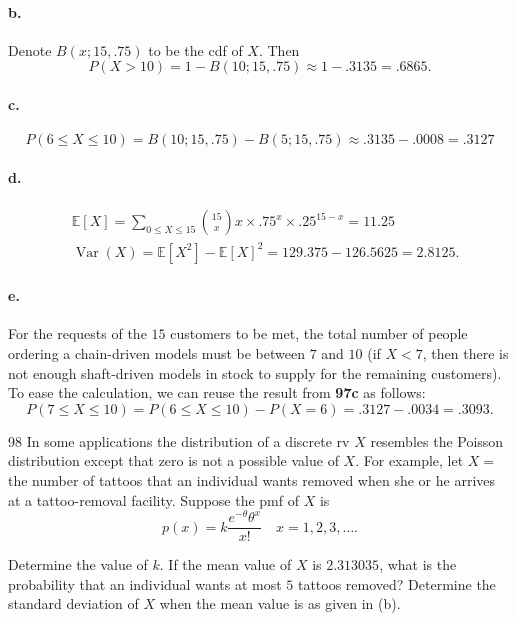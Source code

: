 \documentclass{exam}
\DeclareMathOperator{\Var}{Var}
\begin{document}
\paragraph{b.} Denote $B(x; 15, .75)$ to be the cdf of $X$. Then 
\[
	P(X > 10) = 1 - B(10; 15, .75) \approx 1 - .3135 = .6865.
\]

\paragraph{c.}
\[
	P(6 \le X \le 10) = B(10; 15, .75) - B(5; 15, .75) \approx .3135 - .0008 = .3127
\]

\paragraph{d.}
\begin{align*}
	& \mathbb E[X] = \sum_{0 \le X \le 15} \binom{15}x x \times .75^x \times .25^{15 - x} = 11.25 \\
	& \Var(X) = \mathbb E[X^2] - \mathbb E[X]^2 = 129.375 - 126.5625 = 2.8125.
\end{align*}

\paragraph{e.} For the requests of the $15$ customers to be met, the total number of people ordering a chain-driven models must be between $7$ and $10$ (if $X < 7$, then there is not enough shaft-driven models in stock to supply for the remaining customers). To ease the calculation, we can reuse the result from \textbf{97c} as follows:
\[
	P(7 \le X \le 10) = P(6 \le X \le 10) - P(X = 6) = .3127 - .0034 = .3093.
\]

\begin{problem}{98}
	In some applications the distribution of a discrete rv $X$ resembles the Poisson distribution except that zero is not a possible value of $X$. For example, let $X =$ the number of tattoos that an individual wants removed when she or he arrives at a tattoo-removal facility. Suppose the pmf of $X$ is
	\[
		p(x) = k\frac{e^{-\theta}\theta^x}{x!} \quad x = 1, 2, 3, \dots.
	\]
	\begin{tasks}[label=\textbf{\alph*.}]
		\task Determine the value of $k$.
		\task If the mean value of $X$ is $2.313035$, what is the probability that an individual wants at most $5$ tattoos removed?
		\task Determine the standard deviation of $X$ when the mean value is as given in (b).
	\end{tasks}
\end{problem}
\end{document}
